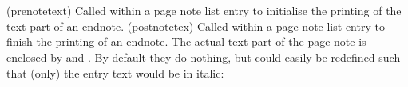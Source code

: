 \bigskip

\begin{syntax}
  \cmd{\prenotetext}\\
  \cmd{\postnotetext}\\
\end{syntax}
\glossary(prenotetext)%
  {}%
  {Called within a page note list entry to initialise the printing
    of the text part of an endnote.}%
\glossary(postnotetex)%
  {}%
  {Called within a page note list entry to finish the printing of an
    endnote.}%
The actual text part of the page note is enclosed by
\cmd{\prenotetext} and . By default they do nothing,
but could easily be redefined such that (only) the entry text would be
in italic: 
\begin{lcode}
\renewcommand\prenotetext{\begingroup\itshape}
\renewcommand\postnotetext{\endgroup}
\end{lcode}










